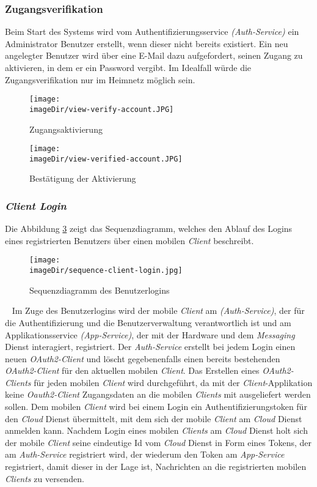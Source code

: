 \subsubsection{Zugangsverifikation}
Beim Start des Systems wird vom Authentifizierungsservice \emph{(Auth-Service)} ein Administrator Benutzer erstellt, wenn dieser nicht bereits existiert. Ein neu angelegter Benutzer wird über eine E-Mail dazu aufgefordert, seinen Zugang zu aktivieren, in dem er ein Password vergibt. Im Idealfall würde die Zugangsverifikation nur im Heimnetz möglich sein.
\begin{figure}[h]
	\centering
	\texttt{[image: \\imageDir/view-verify-account.JPG]}
	\caption{Zugangsaktivierung}
	\label{fig:image-veriy-account}
\end{figure}
\begin{figure}[h]
	\centering
	\texttt{[image: \\imageDir/view-verified-account.JPG]}
	\caption{Bestätigung der Aktivierung}
	\label{fig:image-veriied-account}
\end{figure}

\subsubsection{\emph{Client Login}}
Die Abbildung \ref{fig:image-sequence-client-login} zeigt das Sequenzdiagramm, welches den Ablauf des Logins eines registrierten Benutzers über einen mobilen \emph{Client} beschreibt.
\begin{figure}[h]
	\centering
	\texttt{[image: \\imageDir/sequence-client-login.jpg]}
	\caption{Sequenzdiagramm des Benutzerlogins}
	\label{fig:image-sequence-client-login}
\end{figure}
\ \newpage
Im Zuge des Benutzerlogins wird der mobile \emph{Client} am \emph{(Auth-Service)}, der für die Authentifizierung und die Benutzerverwaltung verantwortlich ist und am Applikationsservice \emph{(App-Service)}, der mit der Hardware und dem \emph{Messaging} Dienst interagiert, registriert. Der \emph{Auth-Service} erstellt bei jedem Login einen neuen \emph{OAuth2-Client} und löscht gegebenenfalls einen bereits bestehenden  \emph{OAuth2-Client} für den aktuellen mobilen \emph{Client}. Das Erstellen eines \emph{OAuth2-Clients} für jeden mobilen \emph{Client} wird durchgeführt, da mit der \emph{Client}-Applikation keine \emph{Oauth2-Client} Zugangsdaten an die mobilen \emph{Clients} mit ausgeliefert werden sollen.
\newline
\newline
Dem mobilen \emph{Client} wird bei einem Login ein Authentifizierungstoken für den \emph{Cloud} Dienst übermittelt, mit dem sich der mobile \emph{Client} am \emph{Cloud} Dienst anmelden kann. Nachdem Login eines mobilen \emph{Clients} am \emph{Cloud} Dienst holt sich der mobile \emph{Client} seine eindeutige Id vom \emph{Cloud} Dienst in Form eines Tokens, der am \emph{Auth-Service} registriert wird, der wiederum den Token am \emph{App-Service} registriert, damit dieser in der Lage ist, Nachrichten an die registrierten mobilen \emph{Clients} zu versenden.  

